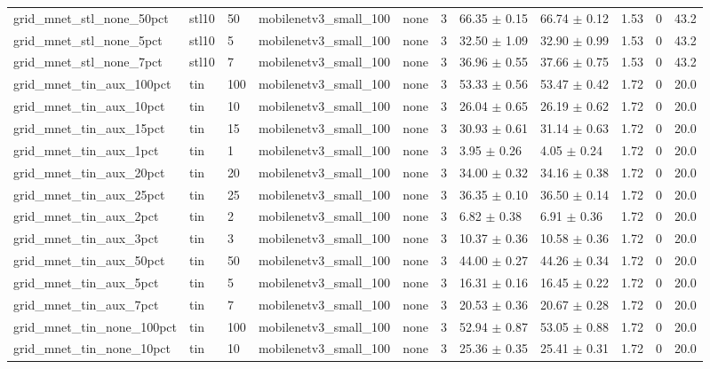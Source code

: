 \begin{tabular}{lllllllllll}
grid_mnet_stl_none_50pct & stl10 & 50 & mobilenetv3_small_100 & none & 3 & 66.35 $\pm$ 0.15 & 66.74 $\pm$ 0.12 & 1.53 & 0 & 43.2 \\
grid_mnet_stl_none_5pct & stl10 & 5 & mobilenetv3_small_100 & none & 3 & 32.50 $\pm$ 1.09 & 32.90 $\pm$ 0.99 & 1.53 & 0 & 43.2 \\
grid_mnet_stl_none_7pct & stl10 & 7 & mobilenetv3_small_100 & none & 3 & 36.96 $\pm$ 0.55 & 37.66 $\pm$ 0.75 & 1.53 & 0 & 43.2 \\
grid_mnet_tin_aux_100pct & tin & 100 & mobilenetv3_small_100 & none & 3 & 53.33 $\pm$ 0.56 & 53.47 $\pm$ 0.42 & 1.72 & 0 & 20.0 \\
grid_mnet_tin_aux_10pct & tin & 10 & mobilenetv3_small_100 & none & 3 & 26.04 $\pm$ 0.65 & 26.19 $\pm$ 0.62 & 1.72 & 0 & 20.0 \\
grid_mnet_tin_aux_15pct & tin & 15 & mobilenetv3_small_100 & none & 3 & 30.93 $\pm$ 0.61 & 31.14 $\pm$ 0.63 & 1.72 & 0 & 20.0 \\
grid_mnet_tin_aux_1pct & tin & 1 & mobilenetv3_small_100 & none & 3 & 3.95 $\pm$ 0.26 & 4.05 $\pm$ 0.24 & 1.72 & 0 & 20.0 \\
grid_mnet_tin_aux_20pct & tin & 20 & mobilenetv3_small_100 & none & 3 & 34.00 $\pm$ 0.32 & 34.16 $\pm$ 0.38 & 1.72 & 0 & 20.0 \\
grid_mnet_tin_aux_25pct & tin & 25 & mobilenetv3_small_100 & none & 3 & 36.35 $\pm$ 0.10 & 36.50 $\pm$ 0.14 & 1.72 & 0 & 20.0 \\
grid_mnet_tin_aux_2pct & tin & 2 & mobilenetv3_small_100 & none & 3 & 6.82 $\pm$ 0.38 & 6.91 $\pm$ 0.36 & 1.72 & 0 & 20.0 \\
grid_mnet_tin_aux_3pct & tin & 3 & mobilenetv3_small_100 & none & 3 & 10.37 $\pm$ 0.36 & 10.58 $\pm$ 0.36 & 1.72 & 0 & 20.0 \\
grid_mnet_tin_aux_50pct & tin & 50 & mobilenetv3_small_100 & none & 3 & 44.00 $\pm$ 0.27 & 44.26 $\pm$ 0.34 & 1.72 & 0 & 20.0 \\
grid_mnet_tin_aux_5pct & tin & 5 & mobilenetv3_small_100 & none & 3 & 16.31 $\pm$ 0.16 & 16.45 $\pm$ 0.22 & 1.72 & 0 & 20.0 \\
grid_mnet_tin_aux_7pct & tin & 7 & mobilenetv3_small_100 & none & 3 & 20.53 $\pm$ 0.36 & 20.67 $\pm$ 0.28 & 1.72 & 0 & 20.0 \\
grid_mnet_tin_none_100pct & tin & 100 & mobilenetv3_small_100 & none & 3 & 52.94 $\pm$ 0.87 & 53.05 $\pm$ 0.88 & 1.72 & 0 & 20.0 \\
grid_mnet_tin_none_10pct & tin & 10 & mobilenetv3_small_100 & none & 3 & 25.36 $\pm$ 0.35 & 25.41 $\pm$ 0.31 & 1.72 & 0 & 20.0 \\

\end{tabular}

